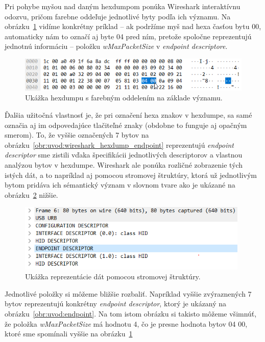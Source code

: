 Pri pohybe myšou nad daným hexdumpom ponúka Wireshark interaktívnu odozvu, pričom farebne oddeľuje jednotlivé byty podľa ich významu. Na obrázku~\ref{obr:uvod:wireshark_hexdump_data_selection} vidíme konkrétny príklad -- ak podržíme myš nad hexa časťou bytu 00, automaticky nám to označí aj byte 04 pred ním, pretože spoločne reprezentujú jednotnú informáciu -- položku \textit{wMaxPacketSize} v \textit{endpoint descriptore}.

\begin{figure}[!htb]
	\centering
	\includegraphics[width=12cm]{img/uvod_wireshark_data_selection}
	\caption{Ukážka hexdumpu s farebným oddelením na základe významu.}
	\label{obr:uvod:wireshark_hexdump_data_selection}
\end{figure}

Ďalšia užitočná vlastnosť je, že pri označení hexa znakov v hexdumpe, sa samé označia aj im odpovedajúce tlačiteľné znaky (obdobne to funguje aj opačným smerom). To, že vyššie označených 7 bytov na obrázku~\ref{obr:uvod:wireshark_hexdump_endpoint} reprezentujú \textit{endpoint descriptor} sme zistili vďaka špecifikácii jednotlivých descriptorov a vlastnou analýzou bytov v hexdumpe. Wireshark ale ponúka rozličné zobrazenie tých istých dát, a to napríklad aj pomocou stromovej štruktúry, ktorá už jednotlivým bytom pridáva ich sémantický význam v slovnom tvare ako je ukázané na obrázku~\ref{obr:uvod:tree_structure} nižšie.

\begin{figure}[!htb]
	\centering
	\includegraphics[width=11cm]{img/uvod_tree_structure}
	\caption{Ukážka reprezentácie dát pomocou stromovej štruktúry.}
	\label{obr:uvod:tree_structure}
\end{figure}

 Jednotlivé položky si môžeme bližšie rozbaliť. Napríklad vyššie zvýraznených 7 bytov reprezentujú konkrétny \textit{endpoint descriptor}, ktorý je ukázaný na obrázku~\ref{obr:uvod:endpoint}. Na tom istom obrázku si takisto môžeme všimnúť, že položka \textit{wMaxPacketSize} má hodnotu 4, čo je presne hodnota bytov 04 00, ktoré sme spomínali vyššie na obrázku~\ref{obr:uvod:wireshark_hexdump_data_selection}

